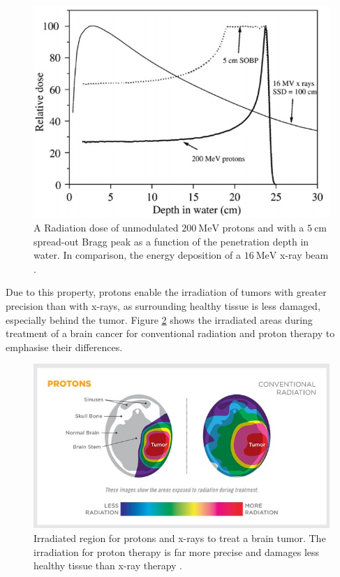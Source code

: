 \begin{figure}
  \centering
  \includegraphics[height=0.6\textwidth]{images/tiefendosis.png}
  \caption{A Radiation dose of unmodulated $\SI{200}{\mega\eV}$ protons and with a $\SI{5}{\centi\meter}$ spread-out Bragg peak
  as a function of the penetration depth in water. In comparison, the energy deposition of a $\SI{16}{\mega\eV}$ x-ray beam \cite{bragg}.}
  \label{fig:bragg}
\end{figure}
Due to this property, protons enable the irradiation of tumors with greater precision than with
x-rays, as surrounding healthy tissue is less damaged, especially behind the tumor. Figure \ref{fig:risk} shows the irradiated areas during treatment of a brain cancer
for conventional radiation and
proton therapy to emphasise their differences.

\begin{figure}
  \centering
  \includegraphics[height=0.5\textwidth]{images/risk.png}
  \caption{Irradiated region for protons and x-rays to treat a brain tumor. The irradiation for proton therapy is far more precise and damages less healthy tissue than
  x-ray therapy \cite{brain}.}
  \label{fig:risk}
\end{figure}


